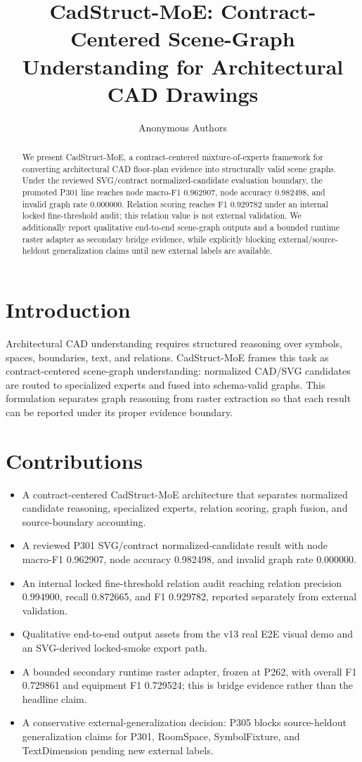 \documentclass[11pt]{article}
\title{CadStruct-MoE: Contract-Centered Scene-Graph Understanding for Architectural CAD Drawings}
\author{Anonymous Authors}
\date{}
\begin{document}
\sloppy
\maketitle

\begin{abstract}
We present CadStruct-MoE, a contract-centered mixture-of-experts framework for converting architectural CAD floor-plan evidence into structurally valid scene graphs. Under the reviewed SVG/contract normalized-candidate evaluation boundary, the promoted P301 line reaches node macro-F1 0.962907, node accuracy 0.982498, and invalid graph rate 0.000000. Relation scoring reaches F1 0.929782 under an internal locked fine-threshold audit; this relation value is not external validation. We additionally report qualitative end-to-end scene-graph outputs and a bounded runtime raster adapter as secondary bridge evidence, while explicitly blocking external/source-heldout generalization claims until new external labels are available.
\end{abstract}

\section{Introduction}
Architectural CAD understanding requires structured reasoning over symbols, spaces, boundaries, text, and relations. CadStruct-MoE frames this task as contract-centered scene-graph understanding: normalized CAD/SVG candidates are routed to specialized experts and fused into schema-valid graphs. This formulation separates graph reasoning from raster extraction so that each result can be reported under its proper evidence boundary.

\section{Contributions}
\begin{itemize}
\item A contract-centered CadStruct-MoE architecture that separates normalized candidate reasoning, specialized experts, relation scoring, graph fusion, and source-boundary accounting.
\item A reviewed P301 SVG/contract normalized-candidate result with node macro-F1 0.962907, node accuracy 0.982498, and invalid graph rate 0.000000.
\item An internal locked fine-threshold relation audit reaching relation precision 0.994900, recall 0.872665, and F1 0.929782, reported separately from external validation.
\item Qualitative end-to-end output assets from the v13 real E2E visual demo and an SVG-derived locked-smoke export path.
\item A bounded secondary runtime raster adapter, frozen at P262, with overall F1 0.729861 and equipment F1 0.729524; this is bridge evidence rather than the headline claim.
\item A conservative external-generalization decision: P305 blocks source-heldout generalization claims for P301, RoomSpace, SymbolFixture, and TextDimension pending new external labels.
\end{itemize}
\end{document}
